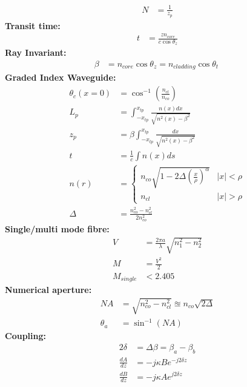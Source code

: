\documentclass[landscape,a4paper]{article}
\begin{document}
\begin{multicols}{3}
	\begin{align}
		N &= \frac{1}{z_p}
	\end{align}
	\hspace{3mm}\textbf{Transit time:}
	\begin{align}
		t &= \frac{z n_{core}}{c \cos \theta_z}
	\end{align}
	\hspace{3mm}\textbf{Ray Invariant:}
	\begin{align}
		\beta &= n_{core} \cos \theta_z = n_{cladding} \cos \theta_t\
	\end{align}
	\hspace{3mm}\textbf{Graded Index Waveguide:}
	\begin{align}
		\theta_c (x=0) &= \cos^{-1} \left( \frac{n_{cl}}{n_{co}} \right)\\
		L_p &= \int_{-x_{tp}}^{x_{tp}} \frac{n(x) dx}{\sqrt{n^2 (x) - \beta^2}}\\
		z_p &= \beta \int_{-x_{tp}}^{x_{tp}} \frac{dx}{\sqrt{n^2(x) - \beta^2}}\\
		t &= \frac{1}{c} \int n(x) ds\\
		n(r) &= 
		\begin{cases}
			n_{co} \sqrt{1 - 2\Delta \left( \frac{x}{\rho} \right)^\alpha} & |x| < \rho\\
			n_{cl} & |x| > \rho
		\end{cases}\\
		\Delta &= \frac{n_{co}^2 - n_{cl}^2}{2n_{co}^2}
	\end{align}
	\textbf{Single/multi mode fibre:}
	\begin{align}
		V &= \frac{2\pi a}{\lambda} \sqrt{n_1^2 - n_2^2}\\
		M &= \frac{V^2}{2}\\
		M_{single} &< 2.405
	\end{align}
	\hspace{3mm}\textbf{Numerical aperture:}
	\begin{align}
	NA &= \sqrt{n_{co}^2 - n_{cl}^2} \approxeq n_{co} \sqrt{2\Delta}\\
	\theta_a &= \sin^{-1} (NA)
	\end{align}
	\textbf{Coupling:}
	\begin{align}
		2\delta &= \Delta \beta = \beta_a - \beta_b\\
		\frac{dA}{dz} &= -j\kappa B e^{-j2\delta z}\\
		\frac{dB}{dz} &= -j\kappa A e^{j2\delta z}

\end{align}
\end{multicols}
\end{document}
